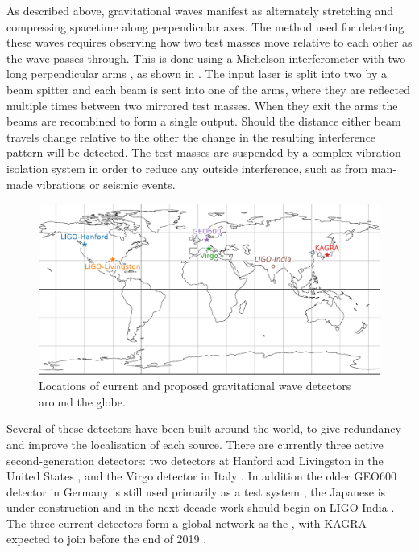 \begin{colsection}
\begin{colsection}
As described above, gravitational waves manifest as alternately stretching and compressing spacetime along perpendicular axes. The method used for detecting these waves requires observing how two test masses move relative to each other as the wave passes through. This is done using a Michelson interferometer with two long perpendicular arms \citep{BIGbirmingham}, as shown in . The input laser is split into two by a beam spitter and each beam is sent into one of the arms, where they are reflected multiple times between two mirrored test masses. When they exit the arms the beams are recombined to form a single output. Should the distance either beam travels change relative to the other the change in the resulting interference pattern will be detected. The test masses are suspended by a complex vibration isolation system in order to reduce any outside interference, such as from man-made vibrations or seismic events.

\begin{figure}[t]
    \begin{center}
        \includegraphics[width=0.95\linewidth]{images/global.pdf}
    \end{center}
    \caption[Locations of gravitational wave detectors]{
        Locations of current and proposed gravitational wave detectors around the globe.
        }\label{fig:global}
\end{figure}

Several of these detectors have been built around the world, to give redundancy and improve the localisation of each source. There are currently three active second-generation detectors: two  detectors at Hanford and Livingston in the United States \citep{LIGO}, and the  Virgo detector in Italy \citep{Virgo}. In addition the older GEO600 detector in Germany is still used primarily as a test system \citep{GEO600}, the Japanese  is under construction \citep{KAGRA} and in the next decade work should begin on LIGO-India \citep{LIGO_India}. The three current detectors form a global network as the , with KAGRA expected to join before the end of 2019 \citep{LIGO-Virgo, LIGO-Virgo-KAGRA}.


\end{colsection}
\end{colsection}

